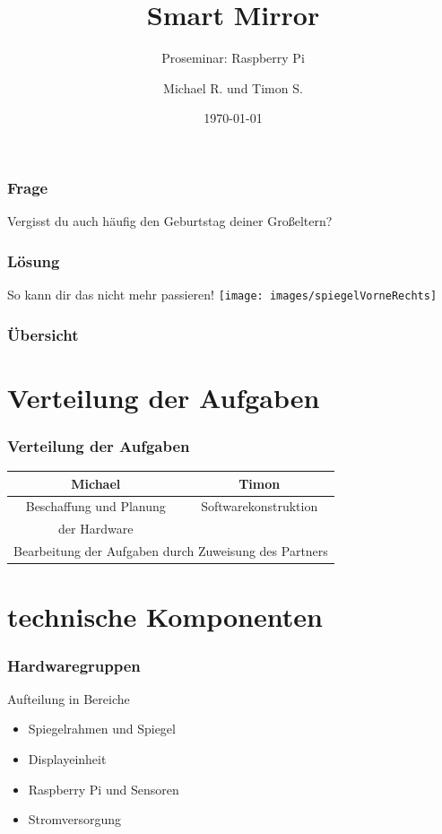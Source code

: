 \documentclass[11pt]{beamer}
\begin{document}
	\author{Michael R. und Timon S.}
	\title{Smart Mirror}
	\subtitle{Proseminar: Raspberry Pi}
	\date{\today}
	
	\begin{frame}
		\titlepage
	\end{frame}

	\begin{frame}
		\frametitle{Frage}
		\huge
		\begin{center}
			\vfill
			Vergisst du auch h\"aufig den Geburtstag deiner Großeltern?
			\vfill
		\end{center}
	\end{frame}

	\begin{frame}
		\frametitle{L\"osung}
		\begin{center}
			\Large
			So kann dir das nicht mehr passieren!
			\texttt{[image: images/spiegelVorneRechts]}
		\end{center}
	\end{frame}

	\begin{frame}
		\frametitle{Übersicht}
		\tableofcontents
	\end{frame}

	\section{Verteilung der Aufgaben}
	\begin{frame}
		\frametitle{Verteilung der Aufgaben}
		\begin{tabular}{|c|c|}
			\hline
			Michael & Timon\\
			\hline\hline
			Beschaffung und Planung & Softwarekonstruktion\\
			der Hardware & \\
			\hline\hline
			\multicolumn{2}{|c|}{Bearbeitung der Aufgaben durch Zuweisung des Partners}\\
			\hline
		\end{tabular}
	\end{frame}

	\section{technische Komponenten}
	\begin{frame}
		\frametitle{Hardwaregruppen}
		\begin{center}
			\Large{Aufteilung in Bereiche}
		\end{center}
		\begin{itemize}
		\item Spiegelrahmen und Spiegel
		\item Displayeinheit
		\item Raspberry Pi und Sensoren
		\item Stromversorgung
		\end{itemize}
	\end{frame}
	
\end{document}
